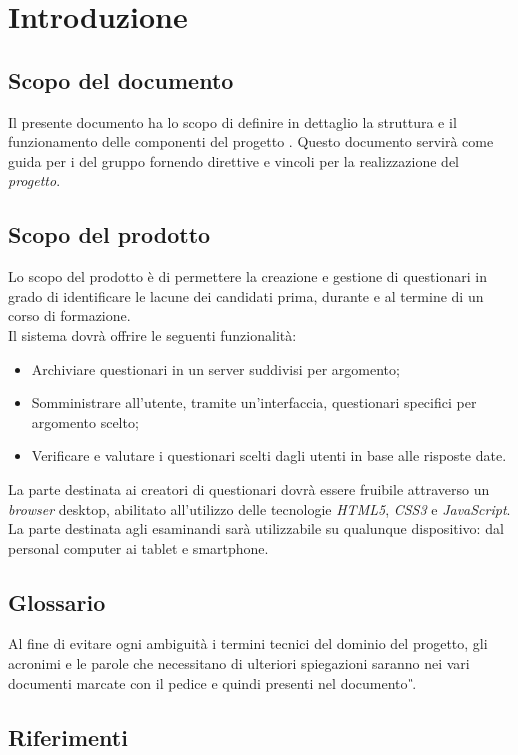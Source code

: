 \newpage
\section{Introduzione}

\subsection{Scopo del documento}
Il presente documento ha lo scopo di definire in dettaglio la struttura e il funzionamento delle componenti del progetto \progetto. Questo documento servirà come guida per i \textit{\Progrs} del gruppo \gruppo fornendo direttive e vincoli per la realizzazione del \textit{progetto}.

\subsection{Scopo del prodotto}
Lo scopo del prodotto è di permettere la creazione e gestione di questionari in grado di identificare le lacune dei candidati prima, durante e al termine di un corso di formazione. 
\\Il sistema dovrà offrire le seguenti funzionalità:
\begin{itemize}
	\item
	Archiviare questionari in un server suddivisi per argomento;
	\item
	Somministrare all'utente, tramite un'interfaccia, questionari specifici per argomento scelto;
	\item
	Verificare e valutare i questionari scelti dagli utenti in base alle risposte date.
\end{itemize}
La parte destinata ai creatori di questionari dovrà essere fruibile attraverso un \textit{browser} desktop, abilitato all'utilizzo delle tecnologie \textit{HTML5}, \textit{CSS3} e \textit{JavaScript}. La parte destinata agli esaminandi sarà utilizzabile su qualunque dispositivo: dal personal computer ai tablet e smartphone.

\subsection{Glossario}
Al fine di evitare ogni ambiguità i termini tecnici del dominio del progetto, gli acronimi e le parole che necessitano di ulteriori spiegazioni saranno nei vari documenti marcate con il pedice  e quindi presenti nel documento \textit{\G}.


\subsection{Riferimenti}
